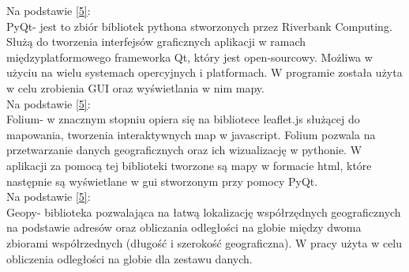 \documentclass[a4paper, twoside, 12pt, justified]{article}
\begin{document}
	 
	 Na podstawie \hyperlink{pyqt}{[5]}:\\
	 PyQt- jest to zbiór bibliotek pythona stworzonych przez Riverbank Computing. Służą do tworzenia interfejsów graficznych aplikacji w ramach międzyplatformowego frameworka Qt, który jest open-sourcowy. Możliwa w użyciu na wielu systemach opercyjnych i platformach. W programie została użyta w celu zrobienia GUI oraz wyświetlania w nim mapy.\\
	 
	 
	 Na podstawie \hyperlink{folium}{[5]}:\\
	 Folium- w znacznym stopniu opiera się na bibliotece leaflet.js służącej do mapowania, tworzenia interaktywnych map w javascript. Folium pozwala na przetwarzanie danych geograficznych oraz ich wizualizację w pythonie. W aplikacji za pomocą tej biblioteki tworzone są mapy w formacie html, które następnie są wyświetlane w gui stworzonym przy pomocy PyQt.\\
	 
	 Na podstawie \hyperlink{geopy}{[5]}:\\
	 Geopy- biblioteka pozwalająca na łatwą lokalizację współrzędnych geograficznych na podstawie adresów oraz obliczania odległości na globie między dwoma zbiorami współrzednych (długość i szerokość geograficzna). W pracy użyta w celu obliczenia odległości na globie dla zestawu danych.\\
	 
	 
	 
	 
	 
	 
	 
	 
	 
	
	
\end{document}
